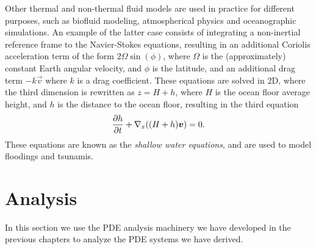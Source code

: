 Other thermal and non-thermal fluid models are used in practice for different purposes, such as biofluid modeling, atmospherical physics and oceanographic simulations. An example of the latter case consists of integrating a non-inertial reference frame to the Navier-Stokes equations, resulting in an additional Coriolis acceleration term of the form $2\Omega \sin(\phi)$, where $\Omega$ is the (approximately) constant Earth angular velocity, and $\phi$ is the latitude, and an additional drag term $-k\vec v$ where $k$ is a drag coefficient. These equations are solved in 2D, where the third dimension is rewritten as $z = H+h$, where $H$ is the ocean floor average height, and $h$ is the distance to the ocean floor, resulting in the third equation
\begin{equation*}
    \frac{\partial h}{\partial t} + \vx((H+h)\vec v) = 0.
\end{equation*}
These equations are known as the \textit{shallow water equations}, and are used to model floodings and tsunamis.  

\section{Analysis}
In this section we use the PDE analysis machinery we have developed in the previous chapters to analyze the PDE systems we have derived. 
